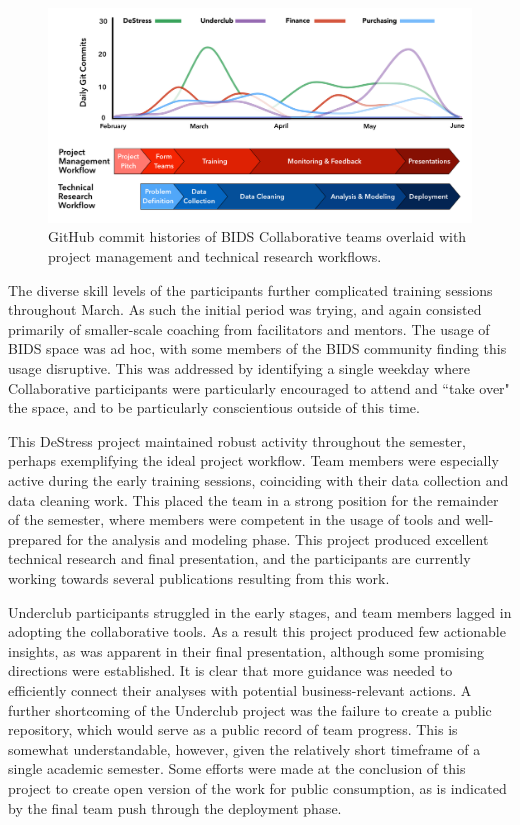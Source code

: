 \documentclass[12pt]{article}
\begin{document}
\begin{figure}
\centerline{\includegraphics[scale=0.435]{BIDS_Collaborative_Workflow_NEW.png}}
\caption{GitHub commit histories of BIDS Collaborative teams overlaid with project management and technical research workflows.}
\label{fig:gitcommits}
\end{figure}

The diverse skill levels of the participants further complicated training sessions throughout March. As such the initial period was trying, and again consisted primarily of smaller-scale coaching from facilitators and mentors. The usage of BIDS space was ad hoc, with some members of the BIDS community finding this usage disruptive. This was addressed by identifying a single weekday where Collaborative participants were particularly encouraged to attend and ``take over" the space, and to be particularly conscientious outside of this time.

This DeStress project maintained robust activity throughout the semester, perhaps exemplifying the ideal project workflow.  Team members were especially active during the early training sessions, coinciding with their data collection and data cleaning work.  This placed the team in a strong position for the remainder of the semester, where members were competent in the usage of tools and well-prepared for the analysis and modeling phase.  This project produced excellent technical research and final presentation, and the participants are currently working towards several publications resulting from this work.

Underclub participants struggled in the early stages, and team members lagged in adopting the collaborative tools.  As a result this project produced few actionable insights, as was apparent in their final presentation, although some promising directions were established. It is clear that more guidance was needed to efficiently connect their analyses with potential business-relevant actions.  A further shortcoming of the Underclub project was the failure to create a public repository, which would serve as a public record of team progress. This is somewhat understandable, however, given the relatively short timeframe of a single academic semester.  Some efforts were made at the conclusion of this project to create open version of the work for public consumption, as is indicated by the final team push through the deployment phase.
\end{document}
